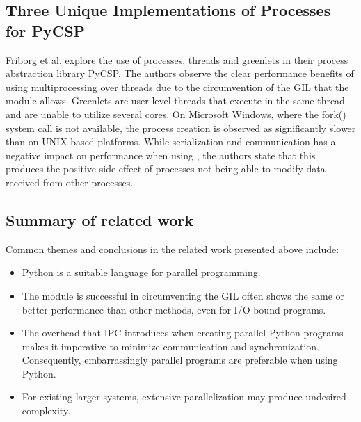 \subsection{Three Unique Implementations of Processes for PyCSP}
Friborg et al. \cite{friborg_2009_three_tuiopfp} explore the use of processes, threads and greenlets in their process abstraction
library PyCSP. The authors observe the clear performance benefits of using multiprocessing over threads due to the circumvention of the GIL
that the  module allows. Greenlets are user-level threads that execute in the same thread and are unable to utilize
several cores. On Microsoft Windows, where the fork() system call is not available, the process creation is observed as
significantly slower than on UNIX-based platforms. While serialization and communication has a negative impact on performance when
using , the authors state that this produces the positive side-effect of processes not being able to
modify data received from other processes.

\subsection{Summary of related work}
Common themes and conclusions in the related work presented above include:

\begin{itemize}
  \item Python is a suitable language for parallel programming.
  \item The  module is successful in circumventing the GIL often shows the same or better performance than other
    methods, even for I/O bound programs.
  \item The overhead that IPC introduces when creating parallel Python programs makes it imperative to minimize communication and
    synchronization. Consequently, embarrassingly parallel programs are preferable when using Python.
  \item For existing larger systems, extensive parallelization may produce undesired complexity.
\end{itemize}
